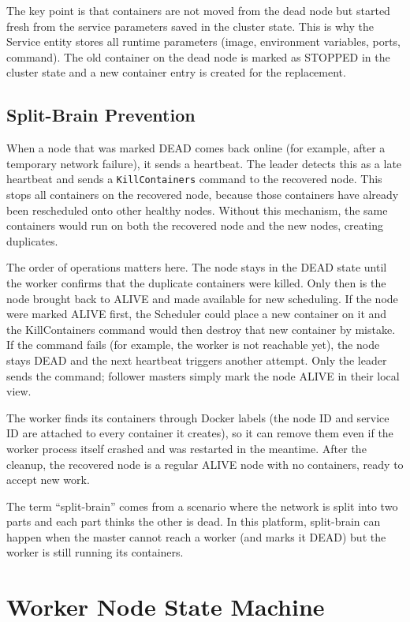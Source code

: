 The key point is that containers are not moved from the dead node but started fresh from the service parameters saved in the cluster state. This is why the Service entity stores all runtime parameters (image, environment variables, ports, command). The old container on the dead node is marked as STOPPED in the cluster state and a new container entry is created for the replacement.

\subsection{Split-Brain Prevention}

When a node that was marked DEAD comes back online (for example, after a temporary network failure), it sends a heartbeat. The leader detects this as a late heartbeat and sends a \texttt{KillContainers} command to the recovered node. This stops all containers on the recovered node, because those containers have already been rescheduled onto other healthy nodes. Without this mechanism, the same containers would run on both the recovered node and the new nodes, creating duplicates.

The order of operations matters here. The node stays in the DEAD state until the worker confirms that the duplicate containers were killed. Only then is the node brought back to ALIVE and made available for new scheduling. If the node were marked ALIVE first, the Scheduler could place a new container on it and the KillContainers command would then destroy that new container by mistake. If the command fails (for example, the worker is not reachable yet), the node stays DEAD and the next heartbeat triggers another attempt. Only the leader sends the command; follower masters simply mark the node ALIVE in their local view.

The worker finds its containers through Docker labels (the node ID and service ID are attached to every container it creates), so it can remove them even if the worker process itself crashed and was restarted in the meantime. After the cleanup, the recovered node is a regular ALIVE node with no containers, ready to accept new work.

The term ``split-brain'' comes from a scenario where the network is split into two parts and each part thinks the other is dead. In this platform, split-brain can happen when the master cannot reach a worker (and marks it DEAD) but the worker is still running its containers.

\section{Worker Node State Machine}

